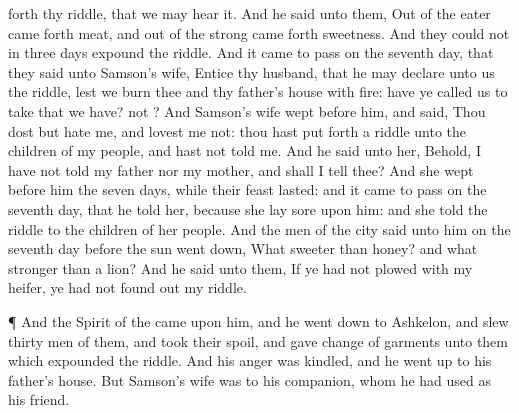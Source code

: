 {forth thy
riddle, that we may
hear it.
And he
said unto them, Out of the
eater came
forth
meat, and out of the
strong came
forth
sweetness. And they
could not in
three
days
expound the
riddle.
And it came to pass on the
seventh
day, that they
said unto
Samson’s
wife,
Entice thy
husband, that he may
declare unto us the
riddle, lest we
burn thee and thy
father’s
house with
fire: have ye
called us to take that we
have?
{} not
{}?
And
Samson’s
wife
wept before him, and
said, Thou dost but
hate me, and
lovest me not: thou hast put
forth a
riddle unto the
children of my
people, and hast not
told
{} me. And he
said unto her, Behold, I have not
told
{} my
father nor my
mother, and shall I
tell
{} thee?
And she
wept before him the
seven
days, while their
feast
lasted: and it came to pass on the
seventh
day, that he
told her, because she lay
sore upon him: and she
told the
riddle to the
children of her
people.
And the
men of the
city
said unto him on the
seventh
day before the
sun went
down, What
{}
sweeter than
honey? and what
{}
stronger than a
lion? And he
said unto them,
If ye had not
plowed with my
heifer, ye had not found
out my
riddle.
\par }{\PP {}¶ And the
Spirit of the
{}
came upon him, and he went
down to
Ashkelon, and
slew
thirty
men of them, and
took their
spoil, and
gave
change of garments unto them which
expounded the
riddle. And his
anger was
kindled, and he went
up to his
father’s
house.
But
Samson’s
wife was
{} to his
companion, whom he had used as his
friend.

}
